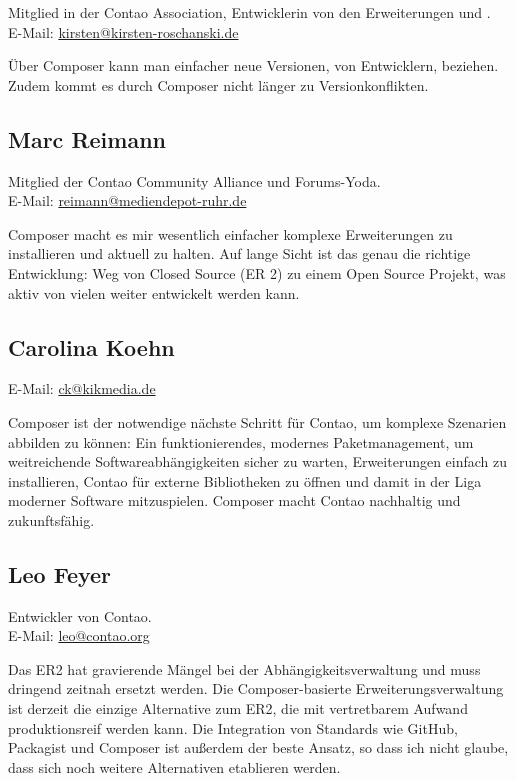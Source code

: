 \documentclass[
paper=a4,
draft=false,%
fontsize=10pt%
]{scrartcl}
\begin{document}
Mitglied in der Contao Association, Entwicklerin von den Erweiterungen  und .\\
E-Mail: \href{mailto:kirsten@kirsten-roschanski.de}{kirsten@kirsten-roschanski.de}

Über Composer kann man einfacher neue Versionen, von Entwicklern, beziehen.  Zudem kommt es durch Composer nicht länger zu Versionkonflikten.

\subsection*{Marc  Reimann}

Mitglied der Contao Community Alliance und Forums-Yoda.\\
E-Mail: \href{mailto:reimann@mediendepot-ruhr.de}{reimann@mediendepot-ruhr.de}

Composer macht es mir wesentlich einfacher komplexe Erweiterungen zu installieren und aktuell zu halten. Auf lange Sicht ist das genau die richtige Entwicklung: Weg von Closed Source (ER 2) zu einem Open Source Projekt, was aktiv von vielen weiter entwickelt werden kann.

\subsection*{Carolina  Koehn}

E-Mail: \href{mailto:ck@kikmedia.de}{ck@kikmedia.de}

Composer ist der notwendige nächste Schritt für Contao, um komplexe Szenarien abbilden zu können: Ein funktionierendes, modernes  Paketmanagement, um weitreichende Softwareabhängigkeiten sicher zu warten, Erweiterungen einfach zu installieren, Contao für externe Bibliotheken zu öffnen und damit in der Liga moderner Software mitzuspielen. Composer macht Contao nachhaltig und zukunftsfähig.

\subsection*{Leo  Feyer}

Entwickler von Contao.\\
E-Mail: \href{mailto:leo@contao.org}{leo@contao.org}

Das ER2 hat gravierende Mängel bei der Abhängigkeitsverwaltung und muss dringend zeitnah ersetzt werden. Die Composer-basierte Erweiterungsverwaltung ist derzeit die einzige Alternative zum ER2, die mit vertretbarem Aufwand produktionsreif werden kann. Die Integration von Standards wie GitHub, Packagist und Composer ist außerdem der beste Ansatz, so dass ich nicht glaube, dass sich noch weitere Alternativen etablieren werden.
\end{document}
